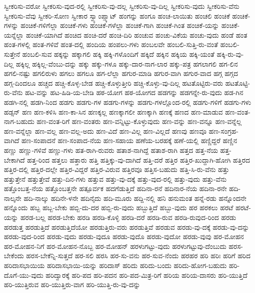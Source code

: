 {ಸ್ವೀಕರಿಸು-ವರೋ
ಸ್ವೀಕರಿಸು-ವುದ-ರಲ್ಲಿ
ಸ್ವೀಕರಿಸು-ವು-ದಲ್ಲ
ಸ್ವೀಕರಿಸು-ವು-ದಿಲ್ಲ
ಸ್ವೀಕರಿಸು-ವುದು
ಸ್ವೀಕರಿಸು-ವೆನು
ಸ್ವೀಕರಿಸು-ವೆವು
ಸ್ವೀಕರಿ-ಸೋಣ
ಸ್ವೀಕಾರ
ಸ್ವ್ಯಾಂಪ್ಸ್ಕಾಟ್
ಹಂಗನ್ನು
ಹಂಗೂ
ಹಂಚ-ಲಾಯಿತು
ಹಂಚಲಿ
ಹಂಚಿಕೆ
ಹಂಚಿಕೆ-ಗಳನ್ನು
ಹಂಚಿಕೆ-ಗಳಿಗೆಲ್ಲಾ
ಹಂಚಿಕೆ-ಗಳು
ಹಂಚಿಕೆ-ಗಳೆಲ್ಲಾ
ಹಂಚಿಕೆ-ಗಾಗಿ
ಹಂಚಿಕೆ-ಗಿಂತ
ಹಂಚಿಕೆ-ಯನ್ನು
ಹಂಚಿಕೆ-ಯನ್ನೆಲ್ಲಾ
ಹಂಚಿಕೆ-ಯಾಗಿದೆ
ಹಂಚಿದ
ಹಂಚಿ-ದರೆ
ಹಂಚಿ-ದಿರಿ
ಹಂಚುವ
ಹಂಚು-ವಿಕೆಯ
ಹಂಚು-ವುದು
ಹಂಡೆ
ಹಂತ
ಹಂತ-ಗಳಲ್ಲಿ
ಹಂತ-ಗಳಿವೆ
ಹಂತ-ದಲ್ಲಿ
ಹಂದಿಯ
ಹಂಪಲು-ಗಳು
ಹಂಬಲವೇ
ಹಂಬಲಿ-ಸುತ್ತಿ-ರು-ವಂತೆ
ಹಂಬಲಿ-ಸುತ್ತೇನೆ
ಹಂಬಲಿ-ಸುವ
ಹಕ್ಕನ್ನು
ಹಕ್ಕಾಗಲಿ
ಹಕ್ಕಿ
ಹಕ್ಕಿ-ಗಳೊಂದಿಗೆ
ಹಕ್ಕಿದೆ
ಹಕ್ಕಿನ
ಹಕ್ಕಿಯ
ಹಕ್ಕಿ-ಯಂತೆ
ಹಕ್ಕಿ-ರು-ವು-ದಿಲ್ಲ
ಹಕ್ಕಿಲ್ಲ
ಹಕ್ಕಿಲ್ಲ-ವೆಂಬು-ದನ್ನು
ಹಕ್ಕು
ಹಕ್ಕು-ಗಳೂ
ಹಕ್ಕು-ದಾರ-ನಾಗ-ಲಾರ
ಹಕ್ಕು-ಪತ್ರ
ಹಗಲಾಗಲಿ
ಹಗ-ಲಿನ
ಹಗಲಿ-ನಷ್ಟು
ಹಗಲಿರುಳು
ಹಗಲು
ಹಗಲೂ
ಹಗ-ಲೆಲ್ಲಾ
ಹಗುರ-ಮಾಡಿ
ಹಗುರ-ವಾಗಿ
ಹಗುರ-ವಾದ
ಹಗ್ಗ
ಹಗ್ಗದ
ಹಗ್ಗ-ದಿಂದಲೂ
ಹಚ್ಚದ
ಹಚ್ಚಿ-ಕೊಳ್ಳ-ಬೇಡ
ಹಚ್ಚಿ-ಕೊಳ್ಳುತ್ತೀರಿ
ಹಚ್ಚಿ-ಕೊಳ್ಳು-ವು-ದಿಲ್ಲ
ಹಟತೊಟ್ಟಿರು-ವರು
ಹಟತೊಟ್ಟಿ-ರು-ವೆನು
ಹಟ-ವನ್ನು
ಹಟ-ಹಿಡಿ-ಯ-ಬೇಡಿ
ಹಠ-ಯೋಗ
ಹಠ-ಯೋಗದ
ಹಡಗನ್ನು
ಹಡಗನ್ನೇ-ರು-ವುದು
ಹಡ-ಗಿನ
ಹಡಗಿ-ನಲ್ಲಿ
ಹಡಗಿ-ನಿಂದ
ಹಡಗು
ಹಡಗು-ಗಳ
ಹಡಗು-ಗಳನ್ನು
ಹಡಗು-ಗಳಲ್ಲೊಂದ-ರಲ್ಲಿ
ಹಡಗು-ಗಳಿಗೆ
ಹಡಗು-ಗಳು
ಹಡ್ಸನ್
ಹಣ
ಹಣ-ಕಳಿಸಿ
ಹಣ-ಕಾ-ಸಿನ
ಹಣಕ್ಕಲ್ಲ
ಹಣಕ್ಕಾಗಲೀ
ಹಣಕ್ಕಾಗಿ
ಹಣಕ್ಕೆ
ಹಣದ
ಹಣ-ಮಾಡುವ
ಹಣ-ವಂತ-ನಾಗ-ಬಹುದು
ಹಣ-ವಂತ-ರಿಗೆ
ಹಣ-ವಂತರು
ಹಣ-ವನ್ನಿಟ್ಟು-ಕೊಳ್ಳುವುದು
ಹಣ-ವನ್ನು
ಹಣ-ವನ್ನೂ
ಹಣ-ವನ್ನೆಲ್ಲ
ಹಣ-ವನ್ನೆಲ್ಲಾ
ಹಣ-ವಲ್ಲ
ಹಣ-ವಲ್ಲ-ಅದು
ಹಣ-ವಿದೆ
ಹಣ-ವಿಲ್ಲ
ಹಣ-ವಿಲ್ಲದೆ
ಹಣವು
ಹಣವೂ
ಹಣ-ಸಂಗ್ರಹ-ವಾಗಿದೆ
ಹಣ-ಸಂಪಾದನೆ
ಹಣ-ಸಂಪಾದ-ನೆಯ
ಹಣ-ಸಹಾಯ
ಹಣೆಯ-ಬರಹಕ್ಕೆ
ಹಣೆ-ಯಲ್ಲಿ
ಹಣ್ಣಿದ್ದರೆ
ಹಣ್ಣಿನ
ಹಣ್ಣು
ಹಣ್ಣು-ಗಳಿವೆ
ಹಣ್ಣು-ಗಳು
ಹತ-ರಾಗಿ-ರುವರು
ಹತಾಶ-ನಾಗಿದ್ದೆ
ಹತಾಶ-ರಾಗಿ
ಹತ್ತದ
ಹತ್ತ-ನೆಯ
ಹತ್ತ-ಬೇಕಾಗಿದೆ
ಹತ್ತ-ರಿಂದ
ಹತ್ತಲು
ಹತ್ತಾರು
ಹತ್ತಿ
ಹತ್ತಿಕ್ಕು-ವು-ದಾಗಿದೆ
ಹತ್ತಿ-ದರೆ
ಹತ್ತಿರ
ಹತ್ತಿರ-ಖುದ್ದಾಗಿ-ಹೋಗಿ
ಹತ್ತಿರದ
ಹತ್ತಿರ-ದಲ್ಲಿ
ಹತ್ತಿರ-ದಲ್ಲೇ
ಹತ್ತಿರ-ವಿದ್ದರೆ
ಹತ್ತಿರ-ವಿರುವ
ಹತ್ತಿರವೂ
ಹತ್ತಿಸ-ಬಹುದು
ಹತ್ತಿ-ಸಿ-ರು-ವೆನು
ಹತ್ತು
ಹತ್ತುತ್ತೇನೆ
ಹತ್ತುತ್ತೇವೆ
ಹತ್ತು-ದಿನ-ಗಳು
ಹತ್ತುವ
ಹತ್ತು-ವು-ದಕ್ಕೆ
ಹತ್ತು-ವುದ-ರಲ್ಲಿ
ಹತ್ತು-ವುದು
ಹತ್ತು-ವೆನು
ಹತ್ತೊಂಬತ್ತ-ನೆಯ
ಹತ್ತೊಂಬತ್ತನೇ
ಹತ್ಪೂರ್ವಕ
ಹದಗೆಡುತ್ತಿದೆ
ಹದಿನಾ-ರನೆ
ಹದಿನಾರ-ನೆಯ
ಹದಿನಾ-ರನೇ
ಹದಿ-ನಾಲ್ಕನೇ
ಹದಿ-ನಾಲ್ಕು
ಹದಿನೇ-ಳನೇ
ಹದಿನೈದು
ಹದಿ-ಮೂರು
ಹದ್ದಿ-ನಲ್ಲಿ
ಹನಿ
ಹನುಮಂತ
ಹನ್ನೆ-ರಡು
ಹನ್ನೊಂದನೇ
ಹನ್ನೊಂದು
ಹಬ್ಬ
ಹಬ್ಬ-ಬೇಕು
ಹಬ್ಬಿ-ದು-ದರ
ಹಬ್ಬಿ-ರು-ವುದು
ಹಬ್ಬುತ್ತಿದೆ
ಹಬ್ಬು-ವುದು
ಹರ
ಹರಕಲು
ಹರಟೆ
ಹರಟೆ-ಯನ್ನು
ಹರಡ-ಬಲ್ಲ
ಹರಡ-ಬೇಕು
ಹರಡಿ
ಹರಡಿ-ಕೊಳ್ಳಿ
ಹರಡಿ-ದರೆ
ಹರಡಿ-ರುವ
ಹರಡಿ-ರುವುದ-ರಿಂದ
ಹರಡು
ಹರಡುತ್ತ
ಹರಡುತ್ತಿದೆ
ಹರಡುತ್ತಿದೆಯೋ
ಹರಡುತ್ತಿರು-ವರು
ಹರಡುತ್ತಿವೆ
ಹರಡುವ
ಹರಡು-ವು-ದಕ್ಕೆ
ಹರಡು-ವು-ದನ್ನು
ಹರಡು-ವುದ-ರಿಂದ
ಹರಡು-ವುದು
ಹರಡು-ವುದೂ
ಹರಡು-ವುದೊ
ಹರಡು-ವುದೋ
ಹರಡು-ವುವು
ಹರ-ಮೋಹನ
ಹರ-ಮೋಹನ-ನಿಗೆ
ಹರ-ಮೋಹನ-ನೊಬ್ಬ
ಹರ-ಮೋಹನ್
ಹರಳುಗಟ್ಟು-ವುದು
ಹರಳುಗಟ್ಟುವು-ದೆಂಬುದು
ಹರಸ-ಬೇಕೆಂದು
ಹರಸ-ಬೇಕೆನ್ನಿ-ಸುತ್ತದೆ
ಹರ-ಸಲಿ
ಹರಸಿ
ಹರ-ಸು-ವನು
ಹರ-ಸುವ-ನೆಂದು
ಹರಹರ
ಹರಿ
ಹರಿಃ
ಹರಿಗೆ
ಹರಿದ
ಹರಿದಾಸಭಾಯಿಯ
ಹರಿದಾಸಭಾಯಿ-ಯನ್ನು
ಹರಿದಾಸ್
ಹರಿದು
ಹರಿದು-ಬಂದು
ಹರಿದು-ಹೋಗ-ಬಹುದು
ಹರಿ-ದೊಗೆ-ಯು-ವುದು
ಹರಿದ್ವಾರಕ್ಕೆ
ಹರಿ-ಪದ
ಹರಿ-ಪದನ
ಹರಿ-ಪದ-ಮಿತ್ರ-ರಿಗೆ
ಹರಿಯ
ಹರಿಯ-ದಾಸರು
ಹರಿ-ಯುತ್ತಿದೆ
ಹರಿ-ಯುತ್ತಿರುವ
ಹರಿ-ಯುತ್ತಿರು-ವಾಗ
ಹರಿ-ಯುತ್ತಿ-ರು-ವು-ದನ್ನು
}
